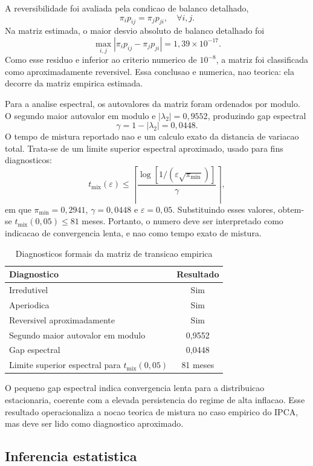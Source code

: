 A reversibilidade foi avaliada pela condicao de balanco detalhado,
\[
\pi_i p_{ij}=\pi_j p_{ji}, \quad \forall i,j.
\]
Na matriz estimada, o maior desvio absoluto de balanco detalhado foi
\[
\max_{i,j}|\pi_i p_{ij}-\pi_j p_{ji}|=1,39\times 10^{-17}.
\]
Como esse residuo e inferior ao criterio numerico de \(10^{-8}\), a matriz foi classificada como aproximadamente reversivel. Essa conclusao e numerica, nao teorica: ela decorre da matriz empirica estimada.

Para a analise espectral, os autovalores da matriz foram ordenados por modulo. O segundo maior autovalor em modulo e \(|\lambda_2|=0,9552\), produzindo gap espectral
\[
\gamma=1-|\lambda_2|=0,0448.
\]
O tempo de mistura reportado nao e um calculo exato da distancia de variacao total. Trata-se de um limite superior espectral aproximado, usado para fins diagnosticos:
\[
t_{\text{mix}}(\varepsilon)
\leq
\left\lceil
\frac{\log\left[1/(\varepsilon\sqrt{\pi_{\min}})\right]}{\gamma}
\right\rceil,
\]
em que \(\pi_{\min}=0,2941\), \(\gamma=0,0448\) e \(\varepsilon=0,05\). Substituindo esses valores, obtem-se \(t_{\text{mix}}(0,05)\leq 81\) meses. Portanto, o numero deve ser interpretado como indicacao de convergencia lenta, e nao como tempo exato de mistura.

\begin{table}[H]
\centering
\caption{Diagnosticos formais da matriz de transicao empirica}
\label{tab:diagnosticos_markov}
\begin{tabular}{lc}
\hline
Diagnostico & Resultado \\
\hline
Irredutivel & Sim \\
Aperiodica & Sim \\
Reversivel aproximadamente & Sim \\
Segundo maior autovalor em modulo & 0,9552 \\
Gap espectral & 0,0448 \\
Limite superior espectral para \(t_{\text{mix}}(0,05)\) & 81 meses \\
\hline
\end{tabular}
\end{table}

O pequeno gap espectral indica convergencia lenta para a distribuicao estacionaria, coerente com a elevada persistencia do regime de alta inflacao. Esse resultado operacionaliza a nocao teorica de mistura no caso empirico do IPCA, mas deve ser lido como diagnostico aproximado.

\subsection{Inferencia estatistica}

